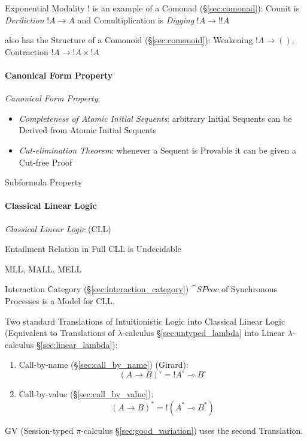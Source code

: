 Exponential Modality $!$ is an example of a Comonad
(\S\ref{sec:comonad}): Counit is \emph{Deriliction} $!A \rightarrow A$
and Comultiplication is \emph{Digging} $!A \rightarrow !!A$

also has the Structure of a Comonoid (\S\ref{sec:comonoid}): Weakening
$!A \rightarrow ()$, Contraction $!A \rightarrow !A \times !A$



\paragraph{Canonical Form Property}\label{sec:canonical_form_property}\hfill

\emph{Canonical Form Property}:
\begin{itemize}
  \item \emph{Completeness of Atomic Initial Sequents}: arbitrary
    Initial Sequents can be Derived from Atomic Initial Sequents
  \item \emph{Cut-elimination Theorem}: whenever a Sequent is Provable
    it can be given a Cut-free Proof
\end{itemize}

Subformula Property



\paragraph{Classical Linear Logic}\label{sec:cll} \hfill

\emph{Classical Linear Logic} (CLL)

Entailment Relation in Full CLL is Undecidable

MLL, MALL, MELL

Interaction Category (\S\ref{sec:interaction_category}) $\cat{SProc}$
of Synchronous Processes is a Model for CLL.

Two standard Translations of Intuitionistic Logic into Classical
Linear Logic (Equivalent to Translations of $\lambda$-calculus
\S\ref{sec:untyped_lambda} into Linear
$\lambda$-calculus \S\ref{sec:linear_lambda}):\cite{wadler12}
\begin{enumerate}
  \item Call-by-name (\S\ref{sec:call_by_name}) (Girard):
\[
  (A \rightarrow B)^\circ = !A^\circ \multimap B^\circ
\]
  \item Call-by-value (\S\ref{sec:call_by_value}):
\[
  (A \rightarrow B)^* = !(A^* \multimap B^*)
\]
\end{enumerate}
GV (Session-typed $\pi$-calculus \S\ref{sec:good_variation}) uses the
second Translation.

